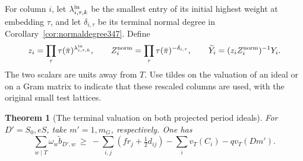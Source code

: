 \documentclass[a4paper,11pt]{article}
\newtheorem{theorem}[proposition]{Theorem}
\theoremstyle{definition}
\theoremstyle{remark}
\numberwithin{equation}{section}
\begin{document}
For column \(i\), let \(\lambda^{\rm in}_{i,\tau,k}\) be the
smallest entry of its initial highest weight at embedding
\(\tau\), and let \(\delta_{i,\tau}\) be its terminal normal
degree in Corollary~\ref{cor:normaldegree347}. Define
\[
 z_i=\prod_\tau\tau(\bar\pi)^{\lambda^{\rm in}_{i,\tau,k}},
 \qquad Z_i^{\rm norm}=\prod_\tau\tau(\bar\pi)^{-\delta_{i,\tau}},
 \qquad
       \widetilde Y_i=(z_i Z_i^{\rm norm})^{-1}Y_i .
\]
The two scalars are units away from \(T\). Use tildes on the
valuation of an ideal or on a Gram matrix to indicate that
these rescaled columns are used, with the original small
test lattices.

\begin{theorem}[The terminal valuation on both projected period ideals]\leavevmode
\label{thm:terminaldegrees454}
For \(D'=S_0,eS\), take \(m'=1,m_G\), respectively. One has
\[
 \sum_{w\mid T}\omega_w\widetilde b_{D',w}\ \ge\
 -\sum_{i,j}\left(fr_j+\tfrac12d_{ij}\right)
 -\sum_i v_T(C_i)-qv_T(Dm').
\]
\end{theorem}
\end{document}
